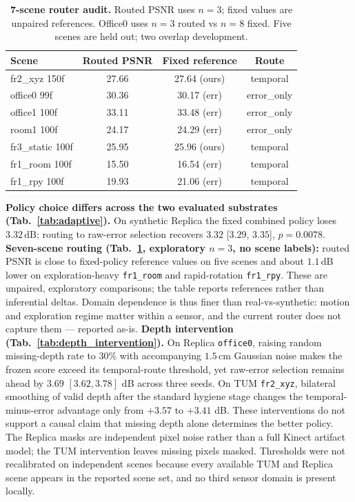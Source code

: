 \documentclass[10pt,twocolumn,letterpaper]{article}
\begin{document}
\begin{table}[tbp]
\centering
\footnotesize\setlength{\tabcolsep}{3pt}
\begin{tabular}{lccc}
\toprule
\textbf{Scene} & \textbf{Routed PSNR} & \textbf{Fixed reference} & \textbf{Route} \\
\midrule
fr2\_xyz 150f & 27.66 & 27.64 (ours) & temporal \\
office0 99f & 30.36 & 30.17 (err) & error\_only \\
office1 100f & 33.11 & 33.48 (err) & error\_only \\
room1 100f & 24.17 & 24.29 (err) & error\_only \\
fr3\_static 100f & 25.95 & 25.96 (ours) & temporal \\
fr1\_room 100f & 15.50 & 16.54 (err) & temporal \\
fr1\_rpy 100f & 19.93 & 21.06 (err) & temporal \\
\bottomrule
\end{tabular}
\caption{\textbf{7-scene router audit.} Routed PSNR uses $n=3$; fixed values are unpaired references. Office0 uses $n=3$ routed vs $n=8$ fixed. Five scenes are held out; two overlap development.}
\label{tab:routing7}
\end{table}

\textbf{Policy choice differs across the two evaluated substrates (Tab.~\ref{tab:adaptive}).}
On synthetic Replica the fixed combined policy loses $3.32\,\mathrm{dB}$; routing to raw-error selection recovers $3.32$ [$3.29$, $3.35$], $p = 0.0078$.
\textbf{Seven-scene routing (Tab.~\ref{tab:routing7}, exploratory $n=3$, no scene labels):} routed PSNR is close to fixed-policy reference values on five scenes and about $1.1\,\mathrm{dB}$ lower on exploration-heavy \texttt{fr1\_room} and rapid-rotation \texttt{fr1\_rpy}. These are unpaired, exploratory comparisons; the table reports references rather than inferential deltas.
Domain dependence is thus finer than real-vs-synthetic: motion and exploration regime matter within a sensor, and the current router does not capture them --- reported as-is.
\textbf{Depth intervention (Tab.~\ref{tab:depth_intervention}).} On Replica \texttt{office0}, raising random missing-depth rate to 30\% with accompanying $1.5\,\mathrm{cm}$ Gaussian noise makes the frozen score exceed its temporal-route threshold, yet raw-error selection remains ahead by $3.69$ $[3.62,3.78]$ dB across three seeds. On TUM \texttt{fr2\_xyz}, bilateral smoothing of valid depth after the standard hygiene stage changes the temporal-minus-error advantage only from $+3.57$ to $+3.41$ dB. These interventions do not support a causal claim that missing depth alone determines the better policy. The Replica masks are independent pixel noise rather than a full Kinect artifact model; the TUM intervention leaves missing pixels masked. Thresholds were not recalibrated on independent scenes because every available TUM and Replica scene appears in the reported scene set, and no third sensor domain is present locally.
\end{document}
